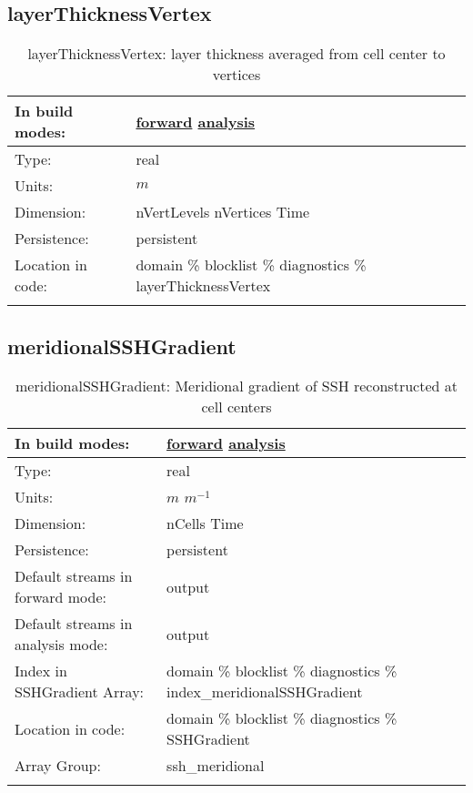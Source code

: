 \subsection[layerThicknessVertex]{layerThicknessVertex}
\label{subsec:var_sec_diagnostics_layerThicknessVertex}
\begin{center}
\begin{longtable}{| p{2.0in} | p{4.0in} |}
        \hline 
        In build modes: & \hyperref[subsec:forward_var_tab_diagnostics]{forward} \hyperref[subsec:analysis_var_tab_diagnostics]{analysis} \\
        \hline 
        Type: & real \\
        \hline 
        Units: & $m$ \\
        \hline 
        Dimension: & nVertLevels nVertices Time \\
        \hline 
        Persistence: & persistent \\
        \hline 
		 Location in code: & domain \% blocklist \% diagnostics \% layerThicknessVertex \\
		 \hline 
    \caption{layerThicknessVertex: layer thickness averaged from cell center to vertices}
\end{longtable}
\end{center}
\subsection[meridionalSSHGradient]{meridionalSSHGradient}
\label{subsec:var_sec_diagnostics_meridionalSSHGradient}
\begin{center}
\begin{longtable}{| p{2.0in} | p{4.0in} |}
        \hline 
        In build modes: & \hyperref[subsec:forward_var_tab_diagnostics]{forward} \hyperref[subsec:analysis_var_tab_diagnostics]{analysis} \\
        \hline 
        Type: & real \\
        \hline 
        Units: & $m$ $m^{-1}$ \\
        \hline 
        Dimension: & nCells Time \\
        \hline 
        Persistence: & persistent \\
        \hline 
		 Default streams in forward mode: &  output \\
        \hline 
		 Default streams in analysis mode: &  output \\
        \hline 
		 Index in SSHGradient Array: & domain \% blocklist \% diagnostics \% index\_meridionalSSHGradient \\
		 \hline 
		 Location in code: & domain \% blocklist \% diagnostics \% SSHGradient \\
		 \hline 
		 Array Group: & ssh\_meridional \\
		 \hline 
    \caption{meridionalSSHGradient: Meridional gradient of SSH reconstructed at cell centers}
\end{longtable}
\end{center}
